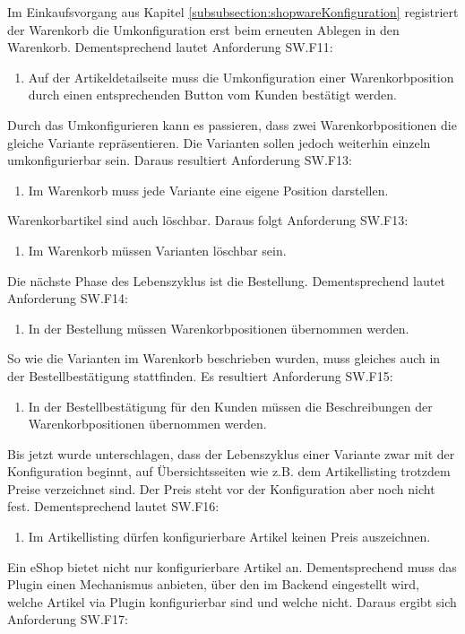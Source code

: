 \documentclass[11pt, a4paper, titlepage, listof=totoc, bibliography=totoc, index=totoc, twoside, openright, headings=normal]{scrreprt}
\begin{document}
Im Einkaufsvorgang aus Kapitel \ref{subsubsection:shopwareKonfiguration} registriert der Warenkorb die Umkonfiguration erst beim erneuten Ablegen in den Warenkorb. Dementsprechend lautet Anforderung SW.F11:
\begin{enumerate}[SW.F11:]\bfseries
\item Auf der Artikeldetailseite muss die Umkonfiguration einer Warenkorbposition durch einen entsprechenden Button vom Kunden bestätigt werden.
\end{enumerate}
Durch das Umkonfigurieren kann es passieren, dass zwei Warenkorbpositionen die gleiche Variante repräsentieren. Die Varianten sollen jedoch weiterhin einzeln umkonfigurierbar sein. Daraus resultiert Anforderung SW.F13:
\begin{enumerate}[SW.F13:]\bfseries
\item Im Warenkorb muss jede Variante eine eigene Position darstellen.
\end{enumerate}
Warenkorbartikel sind auch löschbar. Daraus folgt Anforderung SW.F13:
\begin{enumerate}[SW.F13:]\bfseries
\item Im Warenkorb müssen Varianten löschbar sein.
\end{enumerate}
Die nächste Phase des Lebenszyklus ist die Bestellung. Dementsprechend lautet Anforderung SW.F14:
\begin{enumerate}[SW.F14:]\bfseries
\item In der Bestellung müssen Warenkorbpositionen übernommen werden.
\end{enumerate}
So wie die Varianten im Warenkorb beschrieben wurden, muss gleiches auch in der Bestellbestätigung stattfinden. Es resultiert Anforderung SW.F15:
\begin{enumerate}[SW.F15:]\bfseries
\item In der Bestellbestätigung für den Kunden müssen die Beschreibungen der Warenkorbpositionen übernommen werden.
\end{enumerate}
Bis jetzt wurde unterschlagen, dass der Lebenszyklus einer Variante zwar mit der Konfiguration beginnt, auf Übersichtsseiten wie z.B. dem Artikellisting trotzdem Preise verzeichnet sind. Der Preis steht vor der Konfiguration aber noch nicht fest. Dementsprechend lautet SW.F16:
\begin{enumerate}[SW.F16:]\bfseries
\item Im Artikellisting dürfen konfigurierbare Artikel keinen Preis auszeichnen.
\end{enumerate}
Ein eShop bietet nicht nur konfigurierbare Artikel an. Dementsprechend muss das Plugin einen Mechanismus anbieten, über den im Backend eingestellt wird, welche Artikel via Plugin konfigurierbar sind und welche nicht. Daraus ergibt sich Anforderung SW.F17:
\end{document}
